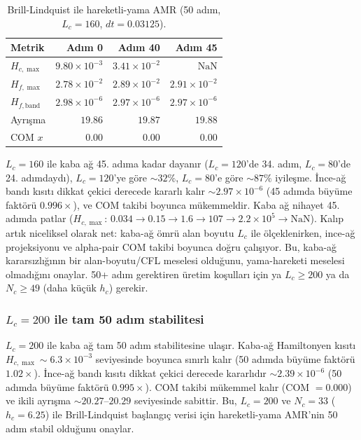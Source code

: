 \begin{table}[t]
\centering
\caption{Brill-Lindquist ile hareketli-yama AMR (50 adım, $L_c=160$, $dt=0.03125$).}
\label{tab:amr-moving-50-Lc160}
\begin{tabular}{lrrr}
\hline
Metrik & Adım 0 & Adım 40 & Adım 45 \\
\hline
$H_{c,\max}$ & $9.80\times 10^{-3}$ & $3.41\times 10^{-2}$ & $\text{NaN}$ \\
$H_{f,\max}$ & $2.78\times 10^{-2}$ & $2.89\times 10^{-2}$ & $2.91\times 10^{-2}$ \\
$H_{f,\text{band}}$ & $2.98\times 10^{-6}$ & $2.97\times 10^{-6}$ & $2.97\times 10^{-6}$ \\
Ayrışma & $19.86$ & $19.87$ & $19.88$ \\
COM $x$ & $0.00$ & $0.00$ & $0.00$ \\
\hline
\end{tabular}
\end{table}

$L_c=160$ ile kaba ağ 45. adıma kadar dayanır ($L_c=120$'de 34. adım, $L_c=80$'de 24. adımdaydı), $L_c=120$'ye göre $\sim 32\%$, $L_c=80$'e göre $\sim 87\%$ iyileşme. İnce-ağ bandı kısıtı dikkat çekici derecede kararlı kalır $\sim 2.97\times 10^{-6}$ (45 adımda büyüme faktörü $0.996\times$), ve COM takibi boyunca mükemmeldir. Kaba ağ nihayet 45. adımda patlar ($H_{c,\max}$: $0.034 \to 0.15 \to 1.6 \to 107 \to 2.2\times 10^5 \to \text{NaN}$). Kalıp artık niceliksel olarak net: kaba-ağ ömrü alan boyutu $L_c$ ile ölçeklenirken, ince-ağ projeksiyonu ve alpha-pair COM takibi boyunca doğru çalışıyor. Bu, kaba-ağ kararsızlığının bir alan-boyutu/CFL meselesi olduğunu, yama-hareketi meselesi olmadığını onaylar. 50+ adım gerektiren üretim koşulları için ya $L_c \ge 200$ ya da $N_c \ge 49$ (daha küçük $h_c$) gerekir.

\subsubsection{$L_c=200$ ile tam 50 adım stabilitesi}

$L_c=200$ ile kaba ağ tam 50 adım stabilitesine ulaşır. Kaba-ağ Hamiltonyen kısıtı $H_{c,\max} \sim 6.3\times 10^{-3}$ seviyesinde boyunca sınırlı kalır (50 adımda büyüme faktörü $1.02\times$). İnce-ağ bandı kısıtı dikkat çekici derecede kararlıdır $\sim 2.39\times 10^{-6}$ (50 adımda büyüme faktörü $0.995\times$). COM takibi mükemmel kalır (COM $= 0.000$) ve ikili ayrışma $\sim 20.27$--$20.29$ seviyesinde sabittir. Bu, $L_c=200$ ve $N_c=33$ ($h_c=6.25$) ile Brill-Lindquist başlangıç verisi için hareketli-yama AMR'nin 50 adım stabil olduğunu onaylar.

